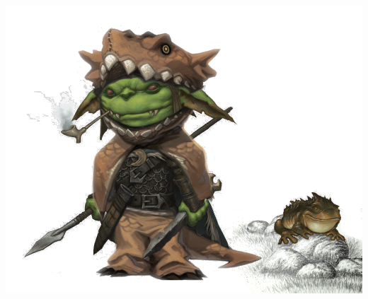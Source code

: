 \begin{multicols}{2}
\begin{center}
\includegraphics[width=\textwidth]{./content/img/krokokolo.png}
\begin{figure}[h]
\end{figure}
\end{center}

\end{multicols}

\vspace*{5mm}



\clearpage